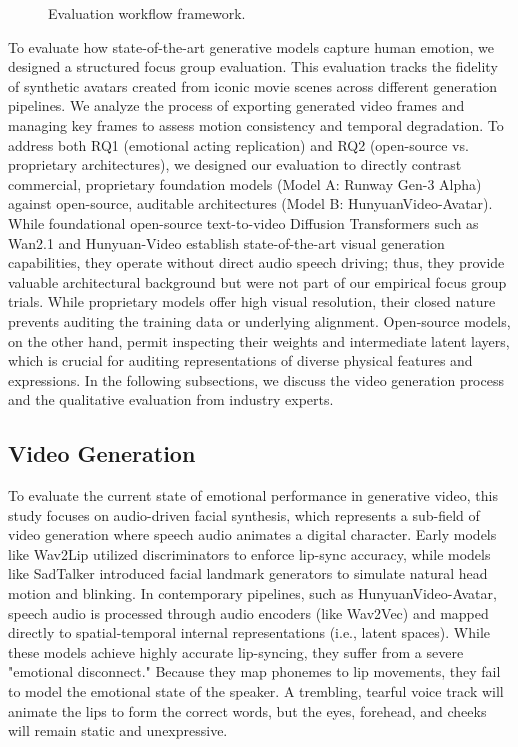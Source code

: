\documentclass[pdflatex,sn-mathphys-num]{sn-jnl}
\theoremstyle{thmstyleone}
\theoremstyle{thmstyletwo}
\theoremstyle{thmstylethree}
\begin{document}
\begin{figure}[ht!]
{
  }
  \caption{Evaluation workflow framework.}
  \label{fig:audio_generation_pipeline}
\end{figure}To evaluate how state-of-the-art generative models capture human emotion, we designed a structured focus group evaluation. This evaluation tracks the fidelity of synthetic avatars created from iconic movie scenes across different generation pipelines. We analyze the process of exporting generated video frames and managing key frames to assess motion consistency and temporal degradation. To address both RQ1 (emotional acting replication) and RQ2 (open-source vs. proprietary architectures), we designed our evaluation to directly contrast commercial, proprietary foundation models (Model A: Runway Gen-3 Alpha) against open-source, auditable architectures (Model B: HunyuanVideo-Avatar). While foundational open-source text-to-video Diffusion Transformers such as Wan2.1 and Hunyuan-Video establish state-of-the-art visual generation capabilities, they operate without direct audio speech driving; thus, they provide valuable architectural background but were not part of our empirical focus group trials. While proprietary models offer high visual resolution, their closed nature prevents auditing the training data or underlying alignment. Open-source models, on the other hand, permit inspecting their weights and intermediate latent layers, which is crucial for auditing representations of diverse physical features and expressions. In the following subsections, we discuss the video generation process and the qualitative evaluation from industry experts.

\subsection{Video Generation}\label{subsec:video_generation}

To evaluate the current state of emotional performance in generative video, this study focuses on audio-driven facial synthesis, which represents a sub-field of video generation where speech audio animates a digital character. Early models like Wav2Lip utilized discriminators to enforce lip-sync accuracy, while models like SadTalker introduced facial landmark generators to simulate natural head motion and blinking. In contemporary pipelines, such as HunyuanVideo-Avatar, speech audio is processed through audio encoders (like Wav2Vec) and mapped directly to spatial-temporal internal representations (i.e., latent spaces). While these models achieve highly accurate lip-syncing, they suffer from a severe "emotional disconnect." Because they map phonemes to lip movements, they fail to model the emotional state of the speaker. A trembling, tearful voice track will animate the lips to form the correct words, but the eyes, forehead, and cheeks will remain static and unexpressive.
\end{document}
